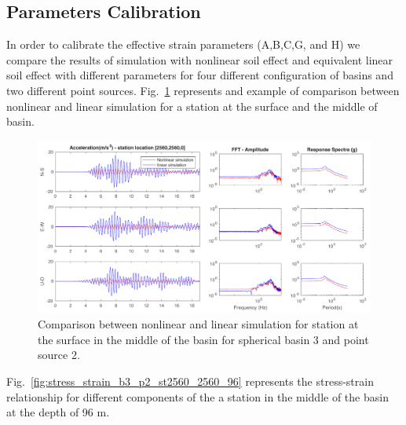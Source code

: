 
\subsection{Parameters Calibration}

In order to calibrate the effective strain parameters (A,B,C,G, and H) we compare the results of simulation with nonlinear soil effect and equivalent linear soil effect with different parameters for four different configuration of basins and two different point sources. Fig.~\ref{fig:comparison_linear_nonlinear} represents and example of comparison between nonlinear and linear simulation for a station at the surface and the middle of basin. 

 \begin{figure}[H]
    \centering
    \includegraphics[width=\textwidth]{figures/pdf/comparison_linear_nonlinear.pdf}
    \caption{Comparison between nonlinear and linear simulation for station at the surface in the middle of the basin for spherical basin 3 and point source 2.}
    \label{fig:comparison_linear_nonlinear}
\end{figure}

Fig.~\ref{fig:stress_strain_b3_p2_st2560_2560_96} represents the stress-strain relationship for different components of the a station in the middle of the basin at the depth of 96 m. 

